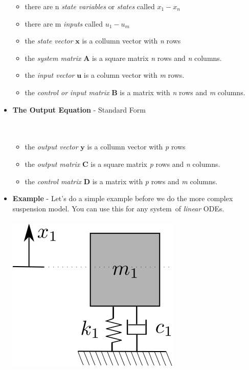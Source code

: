 \documentclass[11pt]{article}
\begin{document}
\begin{itemize}
	\begin{itemize}

		\item there are n {\it state variables} or {\it states} called $x_1 - x_n$ 
		\item there are m {\it inputs} called $u_1 - u_m$ 
		\item the {\it state vector} $\bm{x}$ is a collumn vector with {\it n} rows
		\item the {\it system matrix} $\bm{A}$ is a square matrix {\it n} rows and {\it n} columns.
		\item the {\it input vector} $\bm{u}$ is a column vector with {\it m} rows.
		\item the {\it control or input matrix} $\bm{B}$ is a matrix with {\it n} rows and {\it m} columns. \\

	\end{itemize}
\item \textbf{ \Large The Output Equation} - Standard Form \\\\

	 \vspace{0mm}\\

	\begin{itemize}


		\item the {\it output vector} $\bm{y}$ is a collumn vector with {\it p} rows
		\item the {\it output matrix} $\bm{C}$ is a square matrix {\it p} rows and {\it n} columns.
		\item the {\it control matrix} $\bm{D}$ is a matrix with {\it p} rows and {\it m} columns.

	\end{itemize}


\item \textbf{ \Large Example} - Let's do a simple example before we do the more complex suspension model. You can use this for any system\ of {\it linear} ODEs. \\\\

\includegraphics[scale=.5]{mass_spring_1dof.png} \\
\end{itemize}
\end{document}
